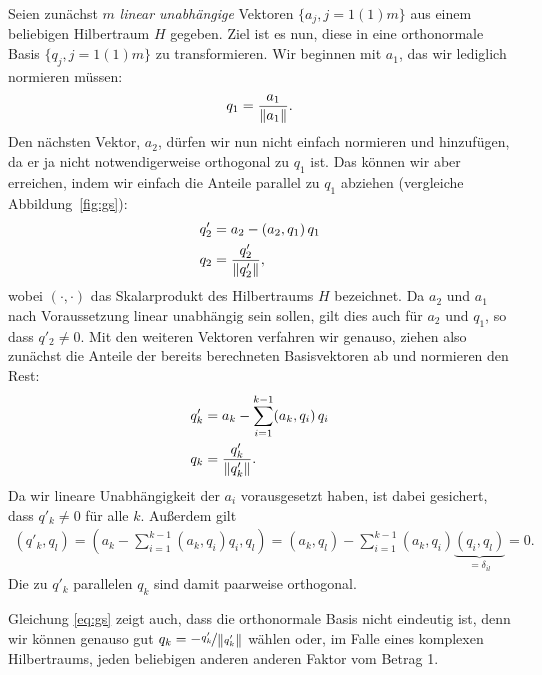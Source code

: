 Seien zunächst $m$ \emph{linear unabhängige} Vektoren $\{a_j,
j=1(1)m\}$ aus einem beliebigen Hilbertraum $H$ gegeben. Ziel ist es
nun, diese in eine orthonormale Basis $\{q_j, j=1(1)m \}$ zu
transformieren. Wir beginnen mit $a_1$, das wir lediglich normieren
müssen:
\begin{equation}
  q_1 = \frac{a_1}{\left\lVert{a_1}\right\rVert}.
\end{equation}
Den nächsten Vektor, $a_2$, dürfen wir nun nicht einfach normieren und
hinzufügen, da er ja nicht notwendigerweise orthogonal zu $q_1$
ist. Das können wir aber erreichen, indem wir einfach die Anteile
parallel zu $q_1$ abziehen (vergleiche Abbildung~\ref{fig:gs}):
\begin{align*}
  q'_2 &= a_2 - (a_2, q_1)\,q_1\\
  q_2 &= \frac{q'_2}{\left\lVert{q'_2}\right\rVert},
\end{align*}
wobei $(\cdot,\cdot)$ das Skalarprodukt des Hilbertraums $H$
bezeichnet.  Da $a_2$ und $a_1$ nach Voraussetzung linear unabhängig
sein sollen, gilt dies auch für $a_2$ und $q_1$, so dass $q'_2\neq
0$. Mit den weiteren Vektoren verfahren wir genauso, ziehen also
zunächst die Anteile der bereits berechneten Basisvektoren ab und
normieren den Rest:
\begin{align}
  \label{eq:gs}
  q'_k &= a_k - \sum_{i=1}^{k-1} (a_k, q_i)\,q_i\\
  q_k &= \frac{q'_k}{\left\lVert{q'_k}\right\rVert}.
\end{align}
Da wir lineare Unabhängigkeit der $a_i$ vorausgesetzt haben, ist dabei
gesichert, dass $q'_k\neq 0$ für alle $k$. Außerdem gilt
\begin{align}
  (q'_k,q_l) = \left(a_k - \sum_{i=1}^{k-1} (a_k, q_i) q_i, q_l\right) =
  (a_k, q_l) - \sum_{i=1}^{k-1} (a_k, q_i) \underbrace{(q_i,
    q_l)}_{=\delta_{il}} = 0.
\end{align}
Die zu $q'_k$ parallelen $q_k$ sind damit paarweise orthogonal.

Gleichung \eqref{eq:gs} zeigt auch, dass die orthonormale Basis nicht
eindeutig ist, denn wir können genauso gut
$q_k=-\nicefrac{q'_k}{\left\lVert{q'_k}\right\rVert}$ wählen oder, im Falle eines
komplexen Hilbertraums, jeden beliebigen anderen anderen Faktor vom
Betrag 1.


